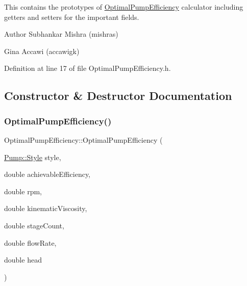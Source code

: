 This contains the prototypes of \hyperlink{class_optimal_pump_efficiency}{Optimal\+Pump\+Efficiency} calculator including getters and setters for the important fields.

\begin{DoxyAuthor}{Author}
Subhankar Mishra (mishras) 

Gina Accawi (accawigk) 
\end{DoxyAuthor}


Definition at line 17 of file Optimal\+Pump\+Efficiency.\+h.



\subsection{Constructor \& Destructor Documentation}
\mbox{\label{class_optimal_pump_efficiency_ae07626ea079ff810ac6518d54c52b24a}} 
\subsubsection{\texorpdfstring{Optimal\+Pump\+Efficiency()}{OptimalPumpEfficiency()}\hspace{0.1cm}{\footnotesize\ttfamily [1/3]}}
{\footnotesize\ttfamily Optimal\+Pump\+Efficiency\+::\+Optimal\+Pump\+Efficiency (\begin{DoxyParamCaption}\item[{\hyperlink{class_pump_aef354601ce4218258cc898b35a1e90ff}{Pump\+::\+Style}}]{style,  }\item[{double}]{achievable\+Efficiency,  }\item[{double}]{rpm,  }\item[{double}]{kinematic\+Viscosity,  }\item[{double}]{stage\+Count,  }\item[{double}]{flow\+Rate,  }\item[{double}]{head }\end{DoxyParamCaption})\hspace{0.3cm}{\ttfamily [inline]}}

